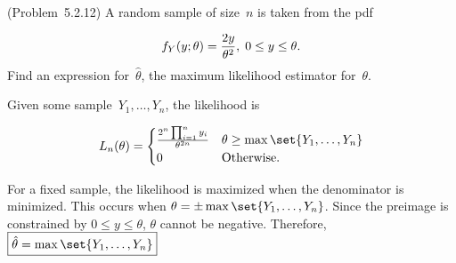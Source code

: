 \begin{problem}
  (\textnormal{Problem~5.2.12}) A random sample of size~$n$ is taken from the pdf

  \begin{equation}\label{eq:P06}
    f_{Y}(y;\theta) = \frac{2y}{\theta^2}, \hspace{0.1cm} 0 \leq y \leq \theta\text{.}
  \end{equation}
  Find an expression for~$\hat{\theta}$, the maximum likelihood estimator for~$\theta$.
\end{problem}

Given some sample~${Y_1,\ldots,Y_n}$, the likelihood is

\begin{equation}\label{eq:P06:Likelihood}
  L_n(\theta) = \begin{cases}
    \frac{2^n \prod_{i=1}^n y_i}{\theta^{2n}} & \theta \geq \max\set{Y_1,\ldots,Y_n} \\
                  0 & \text{Otherwise}\text{.}
                \end{cases}
\end{equation}

\noindent
For a fixed sample, the likelihood is maximized when the denominator is minimized.  This occurs when ${\theta = \pm\max\set{Y_1,\ldots,Y_n}}$.  Since the preimage is constrained by ${0 \leq y \leq \theta}$, $\theta$ cannot be negative.  Therefore, $\boxed{{\hat{\theta} = \max\set{Y_1,\ldots,Y_n}}}$


